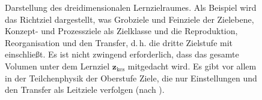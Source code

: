 \begin{figure}[htbp]
\caption[Der Lernzielraum]{Darstellung des dreidimensionalen Lernzielraumes. Als Beispiel wird das Richtziel  dargestellt, was Grobziele und Feinziele der Zielebene, Konzept- und Prozessziele als Zielklasse und die Reproduktion, Reorganisation und den Transfer, d.\,h. die dritte Zielstufe mit einschließt. Es ist nicht zwingend erforderlich, dass das gesamte Volumen unter dem Lernziel $\boldsymbol{z}_\mathrm{kes}$ mitgedacht wird. Es gibt vor allem in der Teilchenphysik der Oberstufe Ziele, die nur Einstellungen und den Transfer als Leitziele verfolgen (nach \cite[S.\,89]{Kircher2013}).}
  \label{fig:ziele}
\end{figure}
